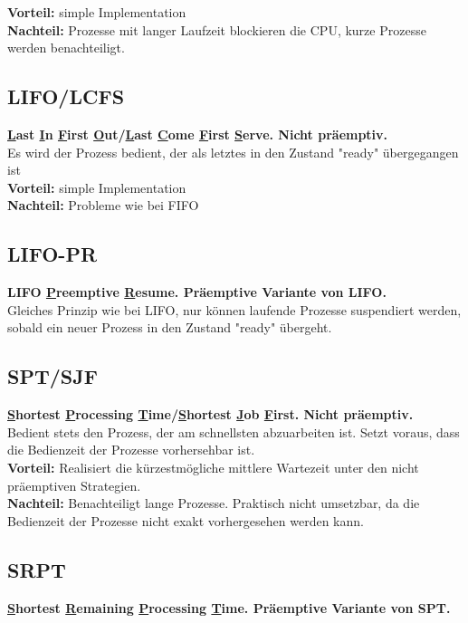 \documentclass[11pt]{scrartcl}
\begin{document}
\textbf{Vorteil:} simple Implementation\\
\textbf{Nachteil:} Prozesse mit langer Laufzeit blockieren die CPU, kurze Prozesse werden benachteiligt.

\subsection{LIFO/LCFS}
\textbf{\underline Last \underline In \underline First \underline Out/\underline Last \underline Come \underline First \underline Serve. Nicht präemptiv.}\\

Es wird der Prozess bedient, der als letztes in den Zustand "ready" übergegangen ist\\

\textbf{Vorteil:} simple Implementation\\
\textbf{Nachteil:} Probleme wie bei FIFO

\subsection{LIFO-PR}
\textbf{LIFO \underline Preemptive \underline Resume. Präemptive Variante von LIFO.}\\

Gleiches Prinzip wie bei LIFO, nur können laufende Prozesse suspendiert werden, sobald ein neuer Prozess in den Zustand "ready"  übergeht.

\subsection{SPT/SJF}
\textbf{\underline Shortest \underline Processing \underline Time/\underline Shortest \underline Job \underline First. Nicht präemptiv.}\\

Bedient stets den Prozess, der am schnellsten abzuarbeiten ist. Setzt voraus, dass die Bedienzeit der Prozesse vorhersehbar ist.\\

\textbf{Vorteil:} Realisiert die kürzestmögliche mittlere Wartezeit unter den nicht präemptiven Strategien.\\
\textbf{Nachteil:} Benachteiligt lange Prozesse. Praktisch nicht umsetzbar, da die Bedienzeit der Prozesse nicht exakt vorhergesehen werden kann.

\subsection{SRPT}
\textbf{\underline Shortest \underline Remaining \underline Processing \underline Time. Präemptive Variante von SPT.}\\
\end{document}
